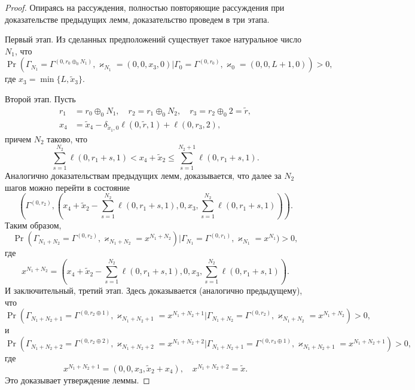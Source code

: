 \documentclass[a4paper,12pt,russian]{extarticle}
\begin{document}
\begin{proof}
Опираясь на рассуждения, полностью повторяющие рассуждения при доказательстве предыдущих лемм, доказательство проведем в три этапа.

Первый этап. Из сделанных предположений существует такое натуральное число $N_1$, что 
\begin{equation*}
\Pr(\Gamma_{N_1}=\Gamma^{(0,r_0\oplus_0 N_1)}, \varkappa_{N_1}=(0,0,x_3,0)|
\Gamma_{0}=\Gamma^{(0,r_0)}, \varkappa_{0}=(0,0,L+1,0))>0,
\end{equation*}
где $x_3=\min\{L,\tilde{x}_3\}$.

Второй этап. Пусть
\begin{align*}
r_1&=r_0\oplus_0 N_1, \quad r_2=r_1\oplus_0 N_2, \quad r_3=r_2\oplus_0 2 = \tilde{r},\\
x_4&=\tilde{x}_4 - \delta_{\tilde{x}_1,0}\ell(0,\tilde{r},1) + \ell(0,r_3,2),
\end{align*}
причем $N_2$ таково, что 
\begin{equation*}
\sum_{s=1}^{N_2} \ell(0,r_1+s,1) < x_4 + \tilde{x}_2 \leqslant \sum_{s=1}^{N_2+1} \ell(0,r_1+s,1).
\end{equation*}
Аналогично доказательствам предыдущих лемм, доказывается, что далее за $N_2$ шагов можно перейти в состояние 
\begin{equation*}
(\Gamma^{(0,r_2)}, (x_4 + \tilde{x}_2 - \sum_{s=1}^{N_2} \ell(0,r_1+s,1),0,x_3,\sum_{s=1}^{N_2} \ell(0,r_1+s,1))).
\end{equation*}
Таким образом,
\begin{equation*}
\Pr(\Gamma_{N_1+N_2}=\Gamma^{(0,r_2)}, \varkappa_{N_1+N_2}=x^{N_1+N_2 })|
\Gamma_{N_1}=\Gamma^{(0,r_1)}, \varkappa_{N_1}=x^{N_1})>0,
\end{equation*}
где 
\begin{equation*}
x^{N_1+N_2} = (x_4 + \tilde{x}_2 - \sum_{s=1}^{N_2} \ell(0,r_1+s,1),0,x_3,\sum_{s=1}^{N_2} \ell(0,r_1+s,1)).
\end{equation*}
И заключительный, третий этап. Здесь доказывается (аналогично предыдущему), что 
\begin{equation*}
\Pr(\Gamma_{N_1+N_2+1}=\Gamma^{(0,r_2\oplus 1)}, \varkappa_{N_1+N_2+1}=x^{N_1+N_2+1}|
\Gamma_{N_1+N_2}=\Gamma^{(0,r_2)}, \varkappa_{N_1+N_2}=x^{N_1+N_2})>0,
\end{equation*}
и 
\begin{equation*}
\Pr(\Gamma_{N_1+N_2+2}=\Gamma^{(0,r_2\oplus 2)}, \varkappa_{N_1+N_2+2}=x^{N_1+N_2+2}|
\Gamma_{N_1+N_2+1}=\Gamma^{(0,r_3\oplus 1)}, \varkappa_{N_1+N_2+1}=x^{N_1+N_2+1})>0,
\end{equation*}
где 
\begin{equation*}
x^{N_1+N_2 + 1} = (0,0,x_3,\tilde{x}_2+x_4), \quad x^{N_1+N_2 + 2} = \tilde{x}.
\end{equation*}
Это доказывает утверждение леммы.
\end{proof}
\end{document}

